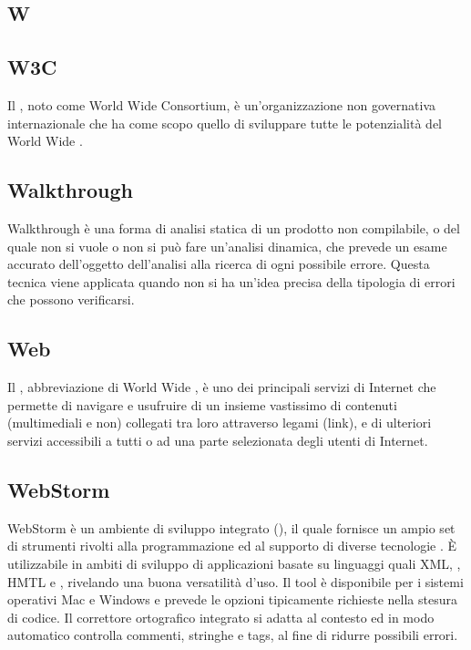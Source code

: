 \newpage

\begin{center}
\Huge\section{\uppercase{W}}
\end{center}

\subsection{W3C}
Il , noto come World Wide  Consortium, è un'organizzazione non governativa internazionale che ha come scopo quello di sviluppare tutte le potenzialità del World Wide .

\subsection{Walkthrough }
Walkthrough è una forma di analisi statica di un prodotto non compilabile, o del
quale non si vuole o non si può fare un'analisi dinamica, che prevede un esame accurato
dell'oggetto dell'analisi alla ricerca di ogni possibile errore. Questa tecnica viene applicata
quando non si ha un'idea precisa della tipologia di errori che possono verificarsi.

\subsection{Web}
Il , abbreviazione di World Wide , è uno dei principali servizi di Internet che permette di navigare e usufruire di un insieme vastissimo di contenuti (multimediali e non) collegati tra loro attraverso legami (link), e di ulteriori servizi accessibili a tutti o ad una parte selezionata degli utenti di Internet.

\subsection{WebStorm}
WebStorm è un ambiente di sviluppo integrato (), il quale fornisce un ampio set di strumenti rivolti alla programmazione ed al supporto di diverse tecnologie . È utilizzabile in ambiti di sviluppo di applicazioni basate su linguaggi quali XML, , HMTL e , rivelando una buona versatilità d'uso. Il tool è disponibile per i sistemi operativi Mac e Windows e prevede le opzioni tipicamente richieste nella stesura di codice. Il correttore ortografico integrato si adatta al contesto ed in modo automatico controlla commenti, stringhe e tags, al fine di ridurre possibili errori.

